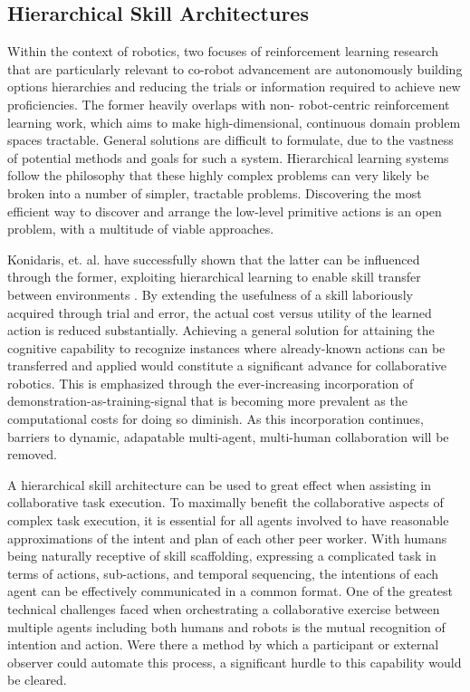 \documentclass[letterpaper]{article}
\begin{document}
\subsection{Hierarchical Skill Architectures}
Within the context of robotics, two focuses of reinforcement learning research that are particularly relevant to co-robot advancement are autonomously building options hierarchies and reducing the trials or information required to achieve new proficiencies. The former heavily overlaps with non- robot-centric reinforcement learning work, which aims to make high-dimensional, continuous domain problem spaces tractable. General solutions are difficult to formulate, due to the vastness of potential methods and goals for such a system. Hierarchical learning systems follow the philosophy that these highly complex problems can very likely be broken into a number of simpler, tractable problems. Discovering the most efficient way to discover and arrange the low-level primitive actions is an open problem, with a multitude of viable approaches\cite{EfficientSkillLearning,AutoHierarchyLearning,LearningHierarchicalControl}.

Konidaris, et. al. have successfully shown that the latter can be influenced through the former, exploiting hierarchical learning to enable skill transfer between environments \cite{AutoSkillAcquisition}. By extending the usefulness of a skill laboriously acquired through trial and error, the actual cost versus utility of the learned action is reduced substantially. Achieving a general solution for attaining the cognitive capability to recognize instances where already-known actions can be transferred and applied would constitute a significant advance for collaborative robotics. This is emphasized through the ever-increasing incorporation of demonstration-as-training-signal that is becoming more prevalent as the computational costs for doing so diminish. As this incorporation continues, barriers to dynamic, adapatable multi-agent, multi-human collaboration will be removed. 
	
A hierarchical skill architecture can be used to great effect when assisting in collaborative task execution. To maximally benefit the collaborative aspects of complex task execution, it is essential for all agents involved to have reasonable approximations of the intent and plan of each other peer worker. With humans being naturally receptive of skill scaffolding, expressing a complicated task in terms of actions, sub-actions, and temporal sequencing, the intentions of each agent can be effectively communicated in a common format. One of the greatest technical challenges faced when orchestrating a collaborative exercise between multiple agents including both humans and robots is the mutual recognition of intention and action. Were there a method by which a participant or external observer could automate this process, a significant hurdle to this capability would be cleared.
 
\end{document}
